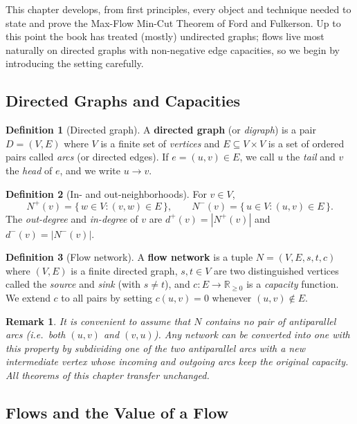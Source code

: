 \documentclass{article}
\newtheorem{remark}{Remark}
\theoremstyle{definition}
\newtheorem{definition}{Definition}
\begin{document}
This chapter develops, from first principles, every object and technique
needed to state and prove the Max-Flow Min-Cut Theorem of Ford and
Fulkerson. Up to this point the book has treated (mostly) undirected
graphs; flows live most naturally on directed graphs with non-negative
edge capacities, so we begin by introducing the setting carefully.

\subsection{Directed Graphs and Capacities}

\begin{definition}[Directed graph]
A \textbf{directed graph} (or \emph{digraph}) is a pair $D = (V, E)$
where $V$ is a finite set of \emph{vertices} and $E \subseteq V \times V$
is a set of ordered pairs called \emph{arcs} (or directed edges). If
$e = (u, v) \in E$, we call $u$ the \emph{tail} and $v$ the \emph{head}
of $e$, and we write $u \to v$.
\end{definition}

\begin{definition}[In- and out-neighborhoods]
For $v \in V$,
\[
  N^+(v) = \{\, w \in V : (v, w) \in E \,\}, \qquad
  N^-(v) = \{\, u \in V : (u, v) \in E \,\}.
\]
The \emph{out-degree} and \emph{in-degree} of $v$ are
$d^+(v) = |N^+(v)|$ and $d^-(v) = |N^-(v)|$.
\end{definition}

\begin{definition}[Flow network]
A \textbf{flow network} is a tuple $N = (V, E, s, t, c)$ where
$(V, E)$ is a finite directed graph, $s, t \in V$ are two
distinguished vertices called the \emph{source} and \emph{sink}
(with $s \ne t$), and $c : E \to \mathbb{R}_{\ge 0}$ is a
\emph{capacity} function. We extend $c$ to all pairs by setting
$c(u, v) = 0$ whenever $(u, v) \notin E$.
\end{definition}

\begin{remark}
It is convenient to assume that $N$ contains no pair of
antiparallel arcs (i.e.\ both $(u, v)$ and $(v, u)$). Any network
can be converted into one with this property by subdividing one of
the two antiparallel arcs with a new intermediate vertex whose
incoming and outgoing arcs keep the original capacity. All theorems
of this chapter transfer unchanged.
\end{remark}

\subsection{Flows and the Value of a Flow}
\end{document}

